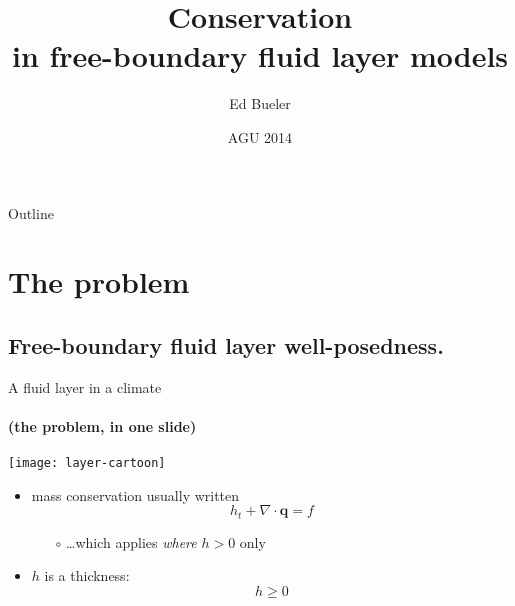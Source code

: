 \documentclass{beamer}
\title[Conservation in free-boundary layers] %
{Conservation \\ in free-boundary fluid layer models}
\author{Ed Bueler}
\institute[UAF] %
{
  Dept of Mathematics and Statistics, and Geophysical Institute\\
  University of Alaska Fairbanks%
}
\date{{\scriptsize AGU 2014}}
\newcommand\bq{\mathbf{q}}
\newcommand{\Div}{\nabla\cdot}
\begin{document}
\begin{frame}
  \titlepage
\end{frame}

\begin{frame}{Outline}
  \tableofcontents
\end{frame}





\section{The problem}

\subsection{Free-boundary fluid layer well-posedness.}


\begin{frame}{A fluid layer in a climate}
\framesubtitle{(the problem, in one slide)}

\begin{center}
\texttt{[image: layer-cartoon]}
\end{center}

  \begin{itemize}
  \item mass conservation usually written
     $$h_t + \Div\bq = f$$
    \begin{itemize}
    \vspace{-6mm}
    \item[$\circ$] \dots which applies \emph{where} $h>0$ only
    \end{itemize}
  \item $h$ is a thickness:
      $$h\ge 0$$
  \end{itemize}
\end{frame}
\end{document}
